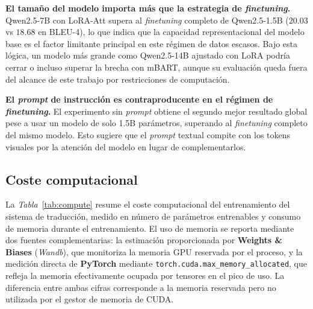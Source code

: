 \textbf{El tamaño del modelo importa más que la estrategia de \textit{finetuning}.}
Qwen2.5-7B con LoRA-Att supera al \textit{finetuning} completo de Qwen2.5-1.5B ($20.03$ vs $18.68$ en BLEU-4), lo que indica que la capacidad representacional del modelo base es el factor limitante principal en este régimen de datos escasos.
Bajo esta lógica, un modelo más grande como Qwen2.5-14B ajustado con LoRA podría cerrar o incluso superar la brecha con mBART, aunque su evaluación queda fuera del alcance de este trabajo por restricciones de computación.

\textbf{El \textit{prompt} de instrucción es contraproducente en el régimen de \textit{finetuning}.}
El experimento sin \textit{prompt} obtiene el segundo mejor resultado global pese a usar un modelo de solo 1.5B parámetros, superando al \textit{finetuning} completo del mismo modelo.
Esto sugiere que el \textit{prompt} textual compite con los tokens visuales por la atención del modelo en lugar de complementarlos.%

\subsection{Coste computacional}
La \textit{Tabla}~\ref{tab:compute} resume el coste computacional del entrenamiento del sistema de traducción, medido en número de parámetros entrenables y consumo de memoria durante el entrenamiento.
El uso de memoria se reporta mediante dos fuentes complementarias: la estimación proporcionada por \textbf{Weights \& Biases} (\textit{Wandb}), que monitoriza la memoria GPU reservada por el proceso, y la medición directa de \textbf{PyTorch} mediante \texttt{torch.cuda.max\_memory\_allocated}, que refleja la memoria efectivamente ocupada por tensores en el pico de uso.
La diferencia entre ambas cifras corresponde a la memoria reservada pero no utilizada por el gestor de memoria de CUDA\@.

